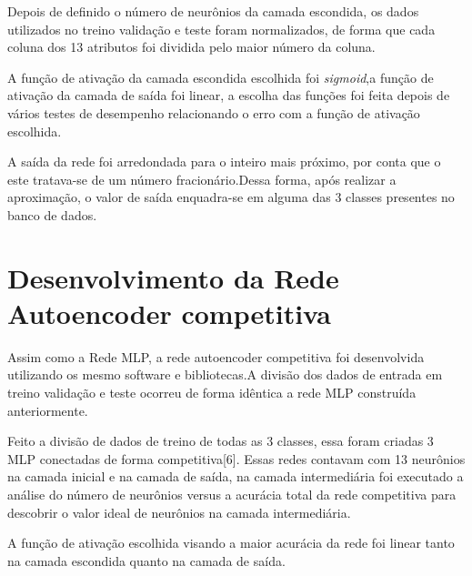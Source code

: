 Depois de definido o número de neurônios da camada escondida, os dados utilizados no treino validação e  teste foram normalizados, de forma que cada coluna dos 13 atributos foi dividida pelo maior número da coluna.

A função de ativação da camada escondida escolhida foi \textit{sigmoid},a função de ativação da camada de saída foi linear, a escolha das funções foi feita depois de vários testes de desempenho relacionando o erro com a função de ativação escolhida.

A saída da rede foi arredondada para o inteiro mais próximo, por conta que o este tratava-se de um número fracionário.Dessa forma, após realizar a aproximação, o valor de saída enquadra-se em alguma das 3 classes presentes no banco de dados.

\section{Desenvolvimento da Rede Autoencoder competitiva}
Assim como a Rede MLP, a  rede autoencoder competitiva foi desenvolvida utilizando os mesmo software e bibliotecas.A divisão dos dados de entrada em treino validação e teste ocorreu de forma idêntica a rede MLP construída anteriormente.

Feito a divisão de dados de treino de todas as 3 classes, essa foram criadas 3 MLP conectadas de forma competitiva[6]. Essas redes contavam com 13 neurônios na camada inicial e na camada de saída, na camada intermediária foi executado a análise do número de neurônios versus a acurácia total da rede competitiva para descobrir o valor ideal de neurônios na camada intermediária.



A função de ativação escolhida visando a maior acurácia da rede foi linear tanto na camada escondida quanto na camada de saída.